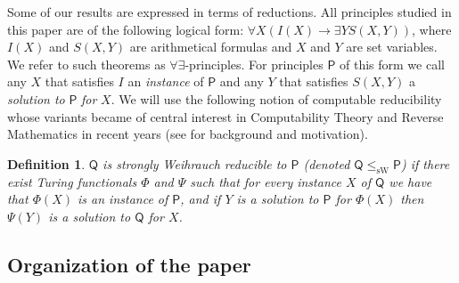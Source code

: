 \documentclass[10pt,a4paper]{article}
\newcommand{\Psf}{\mathsf{P}}
\newcommand{\Qsf}{\mathsf{Q}}
\newcommand{\ACA}[0]{\mathsf{ACA}}
\newcommand{\sW}{\mathrm{sW}}
\numberwithin{theorem}{section}
\newtheorem{definition}[theorem]{Definition}
\begin{document}

Some of our results are expressed in terms of reductions. All principles studied in this paper are of the following logical form: $\forall X (I(X) \to \exists Y S(X,Y))$, where $I(X)$ and $S(X,Y)$ are arithmetical formulas and $X$ and $Y$ are set variables. We refer to such theorems as $\forall\exists$-principles. For principles $\Psf$ of this form we call any $X$ that satisfies $I$ an {\em instance} of $\Psf$ and any $Y$ that satisfies $S(X,Y)$ a {\em solution to} $\Psf$ {\em for} $X$.
We will use the following notion of computable reducibility whose variants became of central interest in Computability Theory and Reverse Mathematics in recent years (see \cite{Dza-Mum:22} for background and motivation).

\begin{definition}
    $\Qsf$ is {\em strongly Weihrauch reducible} to $\Psf$ (denoted $\Qsf \leq_{\sW} \Psf$) if there exist Turing functionals $\Phi$ and $\Psi$ such that for every instance $X$ of $\Qsf$ we have that $\Phi(X)$ is an instance of $\Psf$, and if $Y$ is a solution to $\Psf$ for $\Phi(X)$ then $\Psi(Y)$ is a solution to $\Qsf$ for $X$.
\end{definition}


\subsection{Organization of the paper}
\end{document}
